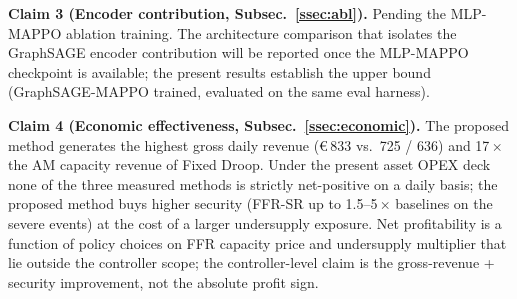 \textbf{Claim 3 (Encoder contribution, Subsec.~\ref{ssec:abl}).}
Pending the MLP-MAPPO ablation training. The architecture comparison
that isolates the GraphSAGE encoder contribution will be reported once
the MLP-MAPPO checkpoint is available; the present results establish
the upper bound (GraphSAGE-MAPPO trained, evaluated on the same eval
harness).

\textbf{Claim 4 (Economic effectiveness, Subsec.~\ref{ssec:economic}).}
The proposed method generates the highest gross daily revenue
(\euro\,833 vs.\ 725 / 636) and 17\,$\times$ the AM capacity revenue of
Fixed Droop. Under the present asset OPEX deck none of the three
measured methods is strictly net-positive on a daily basis; the
proposed method buys higher security (FFR-SR up to 1.5--5\,$\times$
baselines on the severe events) at the cost of a larger undersupply
exposure. Net profitability is a function of policy choices on FFR
capacity price and undersupply multiplier that lie outside the
controller scope; the controller-level claim is the gross-revenue +
security improvement, not the absolute profit sign.
